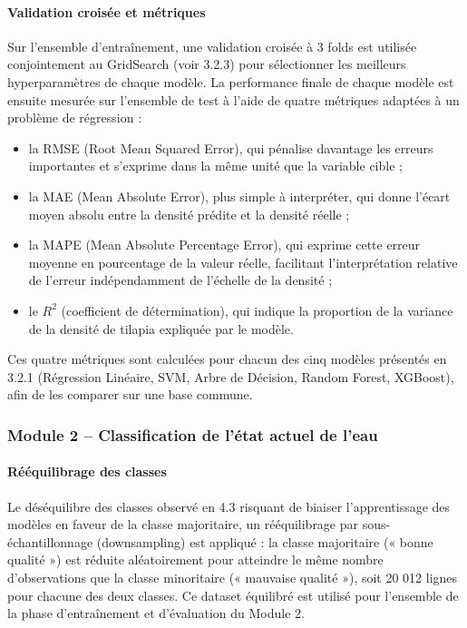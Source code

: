 \documentclass[a4paper,12pt, oneside]{article}
\begin{document}
\paragraph{Validation croisée et métriques\\}
Sur l'ensemble d'entraînement, une validation croisée à 3 folds est utilisée conjointement au GridSearch (voir 3.2.3) pour sélectionner les meilleurs hyperparamètres de chaque modèle. La performance finale de chaque modèle est ensuite mesurée sur l'ensemble de test à l'aide de quatre métriques adaptées à un problème de régression :
\begin{itemize}
    \item la RMSE (Root Mean Squared Error), qui pénalise davantage les erreurs importantes et s'exprime dans la même unité que la variable cible ;
    \item la MAE (Mean Absolute Error), plus simple à interpréter, qui donne l'écart moyen absolu entre la densité prédite et la densité réelle ;
    \item la MAPE (Mean Absolute Percentage Error), qui exprime cette erreur moyenne en pourcentage de la valeur réelle, facilitant l'interprétation relative de l'erreur indépendamment de l'échelle de la densité ;
    \item le $R^2$ (coefficient de détermination), qui indique la proportion de la variance de la densité de tilapia expliquée par le modèle.
\end{itemize}
Ces quatre métriques sont calculées pour chacun des cinq modèles présentés en 3.2.1 (Régression Linéaire, SVM, Arbre de Décision, Random Forest, XGBoost), afin de les comparer sur une base commune.

\subsubsection[Module 2]{Module 2 -- Classification de l'état actuel de l'eau\\}

\paragraph{Rééquilibrage des classes\\}
Le déséquilibre des classes observé en 4.3 risquant de biaiser l'apprentissage des modèles en faveur de la classe majoritaire, un rééquilibrage par sous-échantillonnage (downsampling) est appliqué : la classe majoritaire (« bonne qualité ») est réduite aléatoirement pour atteindre le même nombre d'observations que la classe minoritaire (« mauvaise qualité »), soit 20 012 lignes pour chacune des deux classes. Ce dataset équilibré est utilisé pour l'ensemble de la phase d'entraînement et d'évaluation du Module 2.
\end{document}
